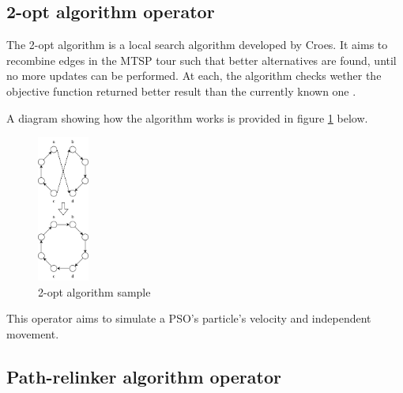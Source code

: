 \documentclass[conference]{IEEEtran}
\begin{document}
\subsection{2-opt algorithm operator}
The 2-opt algorithm is a local search algorithm developed by Croes. It aims to recombine edges in the MTSP tour such that
better alternatives are found, until no more updates can be performed. At each, the algorithm checks wether the objective
function returned better result than the currently known one \cite{b8}.

A diagram showing how the algorithm works is provided in figure \ref{2-opt algorithm sample} below.

\begin{figure}[h]
    \centering
    \includegraphics[width=0.15\textwidth]{images/2-opt.png}
    \caption{2-opt algorithm sample} \label{2-opt algorithm sample}
\end{figure}

This operator aims to simulate a PSO's particle's velocity and independent movement.

\subsection{Path-relinker algorithm operator}
\end{document}
